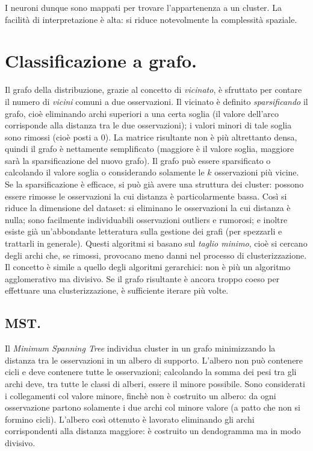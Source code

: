 \documentclass[11pt, a4page, twocolumn]{article}
\begin{document}
I neuroni dunque sono mappati per trovare l'appartenenza a un cluster.
La facilità di interpretazione è alta: si riduce notevolmente la complessità spaziale.

\section{Classificazione a grafo.}
Il grafo della distribuzione, grazie al concetto di \textit{vicinato}, è sfruttato per contare il numero di \textit{vicini} comuni a due osservazioni.
Il vicinato è definito \textit{sparsificando} il grafo, cioè eliminando archi superiori a una certa soglia (il valore dell'arco corrisponde alla distanza tra le due osservazioni); i valori minori di tale soglia sono rimossi (cioè posti a 0).
La matrice risultante non è più altrettanto densa, quindi il grafo è nettamente semplificato (maggiore è il valore soglia, maggiore sarà la sparsificazione del nuovo grafo). \newline
Il grafo può essere sparsificato o calcolando il valore soglia o considerando solamente le $k$ osservazioni più vicine.
Se la sparsificazione è efficace, si può già avere una struttura dei cluster: possono essere rimosse le osservazioni la cui distanza è particolarmente bassa.
Così si riduce la dimensione del dataset: si eliminano le osservazioni la cui distanza è nulla; sono facilmente individuabili osservazioni outliers e rumorosi; e inoltre esiste già un'abbondante letteratura sulla gestione dei grafi (per spezzarli e trattarli in generale).
Questi algoritmi si basano sul \textit{taglio minimo}, cioè si cercano degli archi che, se rimossi, provocano meno danni nel processo di clusterizzazione.
Il concetto è simile a quello degli algoritmi gerarchici: non è più un algoritmo agglomerativo ma divisivo.
Se il grafo risultante è ancora troppo coeso per effettuare una clusterizzazione, è sufficiente iterare più volte. \newline

\subsection{MST.}
Il \textit{Minimum Spanning Tree} individua cluster in un grafo minimizzando la distanza tra le osservazioni in un albero di supporto.
L'albero non può contenere cicli e deve contenere tutte le osservazioni; calcolando la somma dei pesi tra gli archi deve, tra tutte le classi di alberi, essere il minore possibile.
Sono considerati i collegamenti col valore minore, finchè non è costruito un albero: da ogni osservazione partono solamente i due archi col minore valore (a patto che non si formino cicli).
L'albero così ottenuto è lavorato eliminando gli archi corrispondenti alla distanza maggiore: è costruito un dendogramma ma in modo divisivo.
\end{document}
